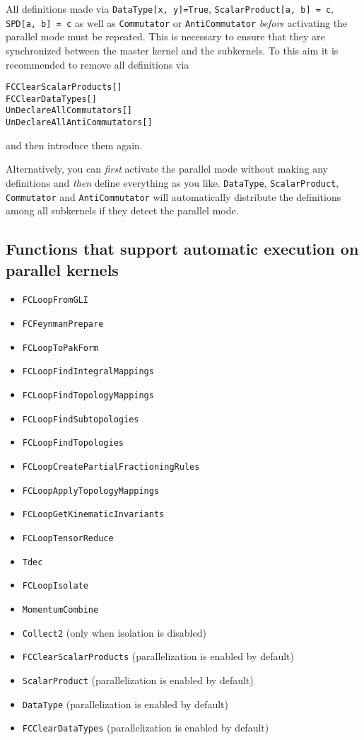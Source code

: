 \documentclass[../FeynCalcManual.tex]{subfiles}
\begin{document}
All definitions made via
\texttt{DataType[\allowbreak{}x,\ \allowbreak{}y]=True},
\texttt{ScalarProduct[\allowbreak{}a,\ \allowbreak{}b] = c},
\texttt{SPD[\allowbreak{}a,\ \allowbreak{}b] = c} as well as
\texttt{Commutator} or \texttt{AntiCommutator} \emph{before} activating
the parallel mode must be repeated. This is necessary to ensure that
they are synchronized between the master kernel and the subkernels. To
this aim it is recommended to remove all definitions via

\begin{verbatim}
FCClearScalarProducts[]
FCClearDataTypes[]
UnDeclareAllCommutators[]
UnDeclareAllAntiCommutators[]
\end{verbatim}

and then introduce them again.

Alternatively, you can \emph{first} activate the parallel mode without
making any definitions and \emph{then} define everything as you like.
\texttt{DataType}, \texttt{ScalarProduct}, \texttt{Commutator} and
\texttt{AntiCommutator} will automatically distribute the definitions
among all subkernels if they detect the parallel mode.

\subsection{Functions that support automatic execution on parallel
kernels}\label{functions-that-support-automatic-execution-on-parallel-kernels}

\begin{itemize}
\tightlist
\item
  \texttt{FCLoopFromGLI}
\item
  \texttt{FCFeynmanPrepare}
\item
  \texttt{FCLoopToPakForm}
\item
  \texttt{FCLoopFindIntegralMappings}
\item
  \texttt{FCLoopFindTopologyMappings}
\item
  \texttt{FCLoopFindSubtopologies}
\item
  \texttt{FCLoopFindTopologies}
\item
  \texttt{FCLoopCreatePartialFractioningRules}
\item
  \texttt{FCLoopApplyTopologyMappings}
\item
  \texttt{FCLoopGetKinematicInvariants}
\item
  \texttt{FCLoopTensorReduce}
\item
  \texttt{Tdec}
\item
  \texttt{FCLoopIsolate}
\item
  \texttt{MomentumCombine}
\item
  \texttt{Collect2} (only when isolation is disabled)
\item
  \texttt{FCClearScalarProducts} (parallelization is enabled by default)
\item
  \texttt{ScalarProduct} (parallelization is enabled by default)
\item
  \texttt{DataType} (parallelization is enabled by default)
\item
  \texttt{FCClearDataTypes} (parallelization is enabled by default)
\end{itemize}
\end{document}

